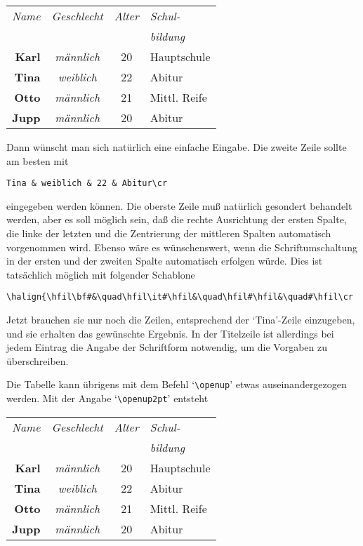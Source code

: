 \medskip\begin{tabular}{rccl}
{\em Name} & {\em Geschlecht} & {\em Alter} & {\em Schul-} \\
 & & & {\em bildung} \\[1ex]
\bf Karl & \em m\"annlich & 20 & Hauptschule\\
\bf Tina & \em weiblich & 22 & Abitur\\
\bf Otto & \em m\"annlich & 21 & Mittl. Reife\\
\bf Jupp & \em m\"annlich & 20 & Abitur
\end{tabular}\medskip

Dann w\"unscht man sich nat\"urlich eine einfache 
Eingabe. Die zweite Zeile sollte am besten mit
\begin{verbatim}
Tina & weiblich & 22 & Abitur\cr
\end{verbatim}
eingegeben werden k\"onnen. Die oberste Zeile mu\ss{} nat\"urlich gesondert
behandelt werden, aber es soll m\"oglich sein, da\ss{} die rechte
Ausrichtung der ersten Spalte,
die linke der letzten und die
Zentrierung der mittleren Spalten automatisch vorgenommen wird. Ebenso
w\"are es w\"unschenswert, wenn die 
Schriftumschaltung in der ersten und
der zweiten Spalte automatisch erfolgen w\"urde. Dies ist tats\"achlich
m\"oglich mit folgender Schablone
\begin{verbatim}
\halign{\hfil\bf#&\quad\hfil\it#\hfil&\quad\hfil#\hfil&\quad#\hfil\cr
\end{verbatim}
Jetzt brauchen sie nur noch die Zeilen, entsprechend der `Tina'-Zeile
einzugeben, und sie erhalten das gew\"unschte Ergebnis. In der
Titelzeile ist allerdings bei jedem Eintrag die Angabe der
Schriftform
notwendig, um die Vorgaben zu \"uberschreiben.

Die Tabelle kann \"ubrigens mit dem Befehl 
`\verb|\openup|' etwas
auseinandergezogen werden. Mit der Angabe `\verb|\openup2pt|' entsteht

\medskip\begin{tabular}{rccl}
{\em Name} & {\em Geschlecht} & {\em Alter} & {\em Schul-} \\[2pt]
 & & & {\em bildung} \\[1ex]
\bf Karl & \em m\"annlich & 20 & Hauptschule\\[2pt]
\bf Tina & \em weiblich & 22 & Abitur\\[2pt]
\bf Otto & \em m\"annlich & 21 & Mittl. Reife\\[2pt]
\bf Jupp & \em m\"annlich & 20 & Abitur
\end{tabular}\medskip

